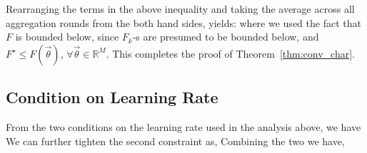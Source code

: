 Rearranging the terms in the above inequality and taking the  average across all aggregation rounds from the both hand sides, yields:
where we used the fact that $F$ is bounded below, since $F_k$-s are presumed to be bounded below, and $F^\star\leq F(\vec{\theta}{}{})$, $\forall \vec{\theta}{}{}\in\mathbb{R}^{M}$. This completes the proof of Theorem~\ref{thm:conv_char}.
\subsection{Condition on Learning Rate}
From the two conditions on the learning rate used in the analysis above, we have
We can further tighten the second constraint as,
Combining the two we have, 

